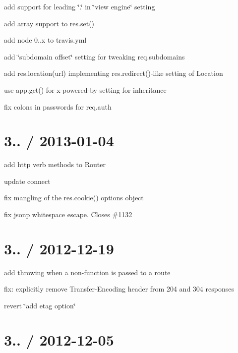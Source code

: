 \begin{DoxyItemize}
\item add support for leading \char`\"{}.\char`\"{} in \char`\"{}view engine\char`\"{} setting
\item add array support to {\ttfamily res.\+set()}
\item add node 0..\+x to travis.\+yml
\item add \char`\"{}subdomain offset\char`\"{} setting for tweaking {\ttfamily req.\+subdomains}
\item add {\ttfamily res.\+location(url)} implementing {\ttfamily res.\+redirect()}-\/like setting of Location
\item use app.\+get() for x-\/powered-\/by setting for inheritance
\item fix colons in passwords for {\ttfamily req.\+auth}
\end{DoxyItemize}

\section*{3.. / 2013-\/01-\/04 }


\begin{DoxyItemize}
\item add http verb methods to Router
\item update connect
\item fix mangling of the {\ttfamily res.\+cookie()} options object
\item fix jsonp whitespace escape. Closes \#1132
\end{DoxyItemize}

\section*{3.. / 2012-\/12-\/19 }


\begin{DoxyItemize}
\item add throwing when a non-\/function is passed to a route
\item fix\+: explicitly remove Transfer-\/\+Encoding header from 204 and 304 responses
\item revert \char`\"{}add \textquotesingle{}etag\textquotesingle{} option\char`\"{}
\end{DoxyItemize}

\section*{3.. / 2012-\/12-\/05 }



